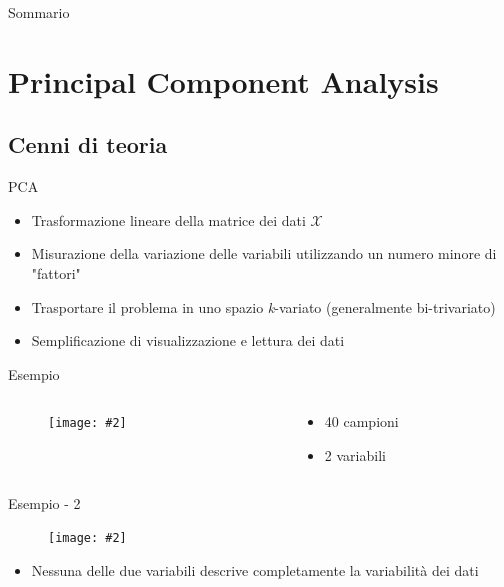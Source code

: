 \documentclass[xcolor={dvipsnames}]{beamer}
\newcommand{\figcen}[2]{
	\begin{figure}
		\begin{center}
			\texttt{[image: \#2]}
		\end{center}
	\end{figure}
}
\begin{document}
\begin{frame}{Sommario}

\tableofcontents

\end{frame}

\section{Principal Component Analysis}

	\subsection{Cenni di teoria}
	
		\begin{frame}{PCA}
			\begin{itemize}
				\item Trasformazione lineare della matrice dei dati $\mathcal{X}$
				\item Misurazione della variazione delle variabili utilizzando un numero minore di "fattori"
				\item Trasportare il problema in uno spazio \emph{k}-variato (generalmente bi-trivariato)
				\item Semplificazione di visualizzazione e lettura dei dati
			\end{itemize}
		\end{frame}


		\begin{frame}{Esempio}
			\begin{columns}
				\begin{column}{0.5\textwidth}
					\figcen{\columnwidth}{plotTeoria}
				\end{column}
				\begin{column}{0.5\textwidth}
					\begin{itemize}
						\item 40 campioni
						\item 2 variabili
					\end{itemize}
				\end{column}
			\end{columns}			
		\end{frame}

		\begin{frame}{Esempio - 2}
			\figcen{.8\textwidth}{proiezione}
			\begin{itemize}
				\item Nessuna delle due variabili descrive completamente la variabilità dei dati
			\end{itemize}
		\end{frame}
\end{document}
